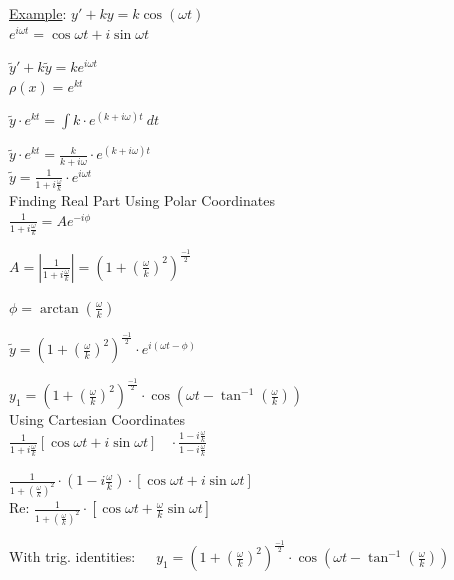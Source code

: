 \documentclass[12pt]{article}
\numberwithin{equation}{subsection}
\newcommand{\cosp}[1]{\cos\left( #1 \right)}
\newcommand{\absp}[1]{\left\vert #1 \right\vert}
\newcommand{\indb}{\hspace{1cm}}
\newcommand{\indc}{\hspace{1.5cm}}
\newcommand{\indd}{\hspace{2cm}}
\newcommand{\inde}{\hspace{2.5cm}}
\begin{document}
\bigskip

\noindent \underline{Example}: \hspace{1cm} $y'+ky=k\cosp{\omega t}$\\

\indd $e^{i\omega t}=\cos \omega t + i \sin \omega t$

\indd $\widetilde{y}' + k\widetilde{y}=ke^{i\omega t}$\\

\inde $\rho (x)= e^{kt}$

\indd $\widetilde{y} \cdot e^{kt} =\int k \cdot e^{(k+i \omega )t}\ dt $

\indd $\widetilde{y} \cdot e^{kt} =\frac{k}{k+i\omega} \cdot e^{(k+i \omega )t} $\\

\indd $\displaystyle \widetilde{y} =\frac{1}{1+i \frac{\omega}{k}} \cdot e^{i \omega t} $\\

Finding Real Part Using Polar Coordinates\\

\indb $\frac{1}{1+i \frac{\omega}{k}} = Ae^{-i\phi}$

\indc $A= \absp{\frac{1}{1+i \frac{\omega}{k}}}= \left(1+ \left(\frac{\omega}{k}\right)^2\right) ^{\frac{-1}{2}}$

\indc $\phi = \arctan \left(\frac{\omega}{k}\right)$

\indb $\widetilde{y}=\left(1+ \left(\frac{\omega}{k}\right)^2\right) ^{\frac{-1}{2}} \cdot e^{i(\omega t - \phi)}$

\indb $ y_{1} = \left(1+ \left(\frac{\omega}{k}\right)^2\right) ^{\frac{-1}{2}} \cdot \cosp{\omega t - \tan^{-1}\left(\frac{\omega}{k}\right)}$\\

Using Cartesian Coordinates\\

\indb $\frac{1}{1+i \frac{\omega}{k}} [\cos \omega t + i \sin \omega t]\ \ \ \ \cdot \frac{1-i \frac{\omega}{k}}{1-i \frac{\omega}{k}}$

\indb $\frac{1}{1+ \left(\frac{\omega}{k}\right)^2}\cdot \left(1-i \frac{\omega}{k}\right)\cdot [\cos \omega t + i \sin \omega t]$\\

\smallskip
\indb Re: $\frac{1}{1+ \left(\frac{\omega}{k}\right)^2}\cdot [\cos \omega t + \frac{\omega}{k} \sin \omega t] $

\indb With trig. identities:\ \ \ $ y_{1} = \left(1+ \left(\frac{\omega}{k}\right)^2\right) ^{\frac{-1}{2}} \cdot \cosp{\omega t - \tan^{-1}\left(\frac{\omega}{k}\right)}$ 
\end{document}

